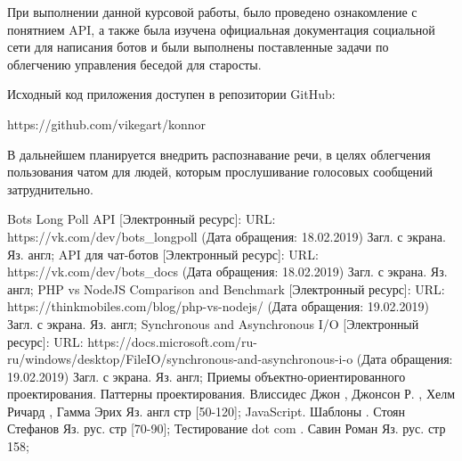 \documentclass[bachelor, och, coursework, times]{SCWorks}
\begin{document}
\conclusion 
При выполнении данной курсовой работы,
было проведено ознакомление с понятнием API, а также
была изучена официальная документация социальной сети для
написания ботов и были выполнены поставленные задачи по облегчению
управления беседой для старосты.

Исходный код приложения доступен в репозитории GitHub: 

https://github.com/vikegart/konnor

В дальнейшем планируется внедрить распознавание речи, в целях облегчения пользования чатом для людей,
которым прослушивание голосовых сообщений затруднительно.
\begin{thebibliography}{99}
   Bots Long Poll API [Электронный ресурс]: URL: https://vk.com/dev/bots\_longpoll (Дата обращения: 18.02.2019) Загл. с экрана. Яз. англ;
   API для чат-ботов [Электронный ресурс]: URL: https://vk.com/dev/bots\_docs (Дата обращения: 18.02.2019) Загл. с экрана. Яз. англ;
   PHP vs NodeJS Comparison and Benchmark [Электронный ресурс]: URL: https://thinkmobiles.com/blog/php-vs-nodejs/ (Дата обращения: 19.02.2019) Загл. с экрана. Яз. англ;
   Synchronous and Asynchronous I/O [Электронный ресурс]: URL: https://docs.microsoft.com/ru-ru/windows/desktop/FileIO/synchronous-and-asynchronous-i-o (Дата обращения: 19.02.2019) Загл. с экрана. Яз. англ;
   Приемы объектно-ориентированного проектирования. Паттерны проектирования.  Влиссидес Джон , Джонсон Р. , Хелм Ричард , Гамма Эрих Яз. англ стр [50-120];
   JavaScript. Шаблоны . Стоян Стефанов Яз. рус. стр [70-90];
   Тестирование dot com . Савин Роман Яз. рус. стр 158;
\end{thebibliography}
\end{document}
